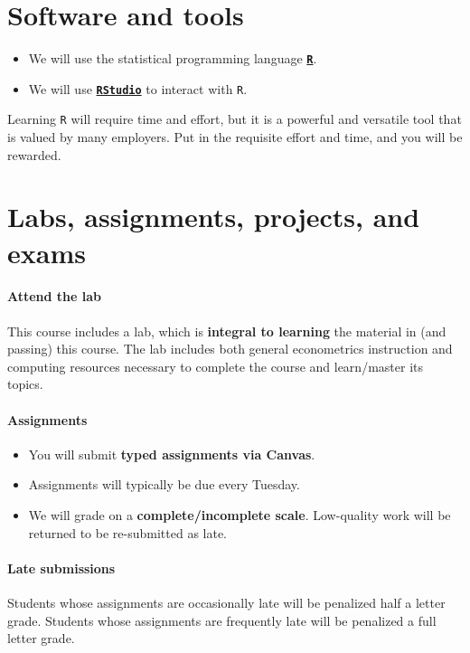 \documentclass[10pt]{article}
\newcommand{\emf}[1]{\textbf{\textcolor{grass_green}{#1}}}
\begin{document}
\section*{Software and tools}

\begin{itemize}
  \item We will use the statistical programming language \href{https://www.r-project.org/}{\textbf{\texttt{R}}}.
  \item We will use \href{https://www.rstudio.com}{\textbf{\texttt{RStudio}}} to interact with \texttt{R}.
\end{itemize}
Learning \texttt{R} will require time and effort, but it is a powerful and versatile tool that is valued by many employers. Put in the requisite effort and time, and you will be rewarded.

\section*{Labs, assignments, projects, and exams}

\paragraph{Attend the lab} This course includes a lab, which is \emf{integral to learning} the material in (and passing) this course. The lab includes both general econometrics instruction and computing resources necessary to complete the course and learn/master its topics.

\paragraph{Assignments}
\begin{itemize}
  \item You will submit \emf{typed assignments via Canvas}.
  \item Assignments will typically be due every Tuesday.
  \item We will grade on a \emf{complete/incomplete scale}. Low-quality work will be returned to be re-submitted as late.
\end{itemize}

\paragraph{Late submissions} Students whose assignments are occasionally late will be penalized half a letter grade. Students whose assignments are frequently late will be penalized a full letter grade. 
\end{document}
